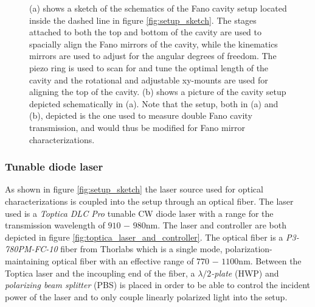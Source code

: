 \begin{figure}[h!]
\begin{subfigure}[b]{0.27\textwidth}
    \end{subfigure}
    \caption{(a) shows a sketch of the schematics of the Fano cavity setup located inside the dashed line in figure \ref{fig:setup_sketch}. The stages attached to both the top and bottom of the cavity are used to spacially align the Fano mirrors of the cavity, while the kinematics mirrors are used to adjust for the angular degrees of freedom. The piezo ring is used to scan for and tune the optimal length of the cavity and the rotational and adjustable xy-mounts are used for aligning the top of the cavity. (b) shows a picture of the cavity setup depicted schematically in (a). Note that the setup, both in (a) and (b), depicted is the one used to measure double Fano cavity transmission, and would thus be modified for Fano mirror characterizations.}
    \label{fig:cavity_setup}
\end{figure}

\subsubsection{Tunable diode laser}

As shown in figure \ref{fig:setup_sketch} the laser source used for optical characterizations is coupled into the setup through an optical fiber. The laser used is a \emph{Toptica DLC Pro} tunable CW diode laser with a range for the transmission wavelength of $910$ $-$ $980$nm\cite{Toptica_laser}. The laser and controller are both depicted in figure \ref{fig:toptica_laser_and_controller}. The optical fiber is a \emph{P3-780PM-FC-10} fiber from Thorlabs which is a single mode, polarization-maintaining optical fiber with an effective range of $770$ $-$ $1100$nm\cite{single_mode_fiber}. Between the Toptica laser and the incoupling end of the fiber, a $\lambda/2$\emph{-plate} (HWP) and \emph{polarizing beam splitter} (PBS) is placed in order to be able to control the incident power of the laser and to only couple linearly polarized light into the setup.  

